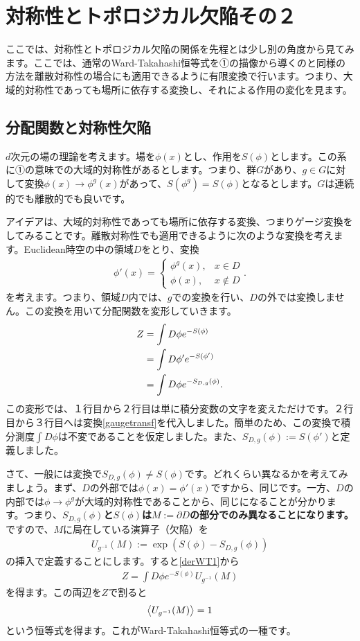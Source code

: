 \documentclass[report,paper=a4, fontsize=12pt, line_length=16cm, number_of_lines=33,dvipdfmx]{jlreq}
\newcommand{\kyou}[1]{{\sffamily \bfseries #1}}
\numberwithin{equation}{chapter}
\newcommand{\del}{\partial}
\begin{document}
\section{対称性とトポロジカル欠陥その２}
ここでは、対称性とトポロジカル欠陥の関係を先程とは少し別の角度から見てみます。ここでは、通常のWard-Takahashi恒等式を①の描像から導くのと同様の方法を離散対称性の場合にも適用できるように有限変換で行います。つまり、大域的対称性であっても場所に依存する変換し、それによる作用の変化を見ます。

\subsection{分配関数と対称性欠陥}
$d$次元の場の理論を考えます。場を$\phi(x)$とし、作用を$S(\phi)$とします。この系に①の意味での大域的対称性があるとします。つまり、群$G$があり、$g\in G$に対して変換$\phi(x) \to \phi^g(x)$があって、$S(\phi^g)=S(\phi)$となるとします。$G$は連続的でも離散的でも良いです。

アイデアは、大域的対称性であっても場所に依存する変換、つまりゲージ変換をしてみることです。離散対称性でも適用できるように次のような変換を考えます。Euclidean時空の中の領域$D$をとり、変換
\begin{align}
  \phi'(x)=
  \begin{cases}
    \phi^g(x), & x\in D\\
    \phi(x), & x \notin D
  \end{cases}
  .\label{gaugetransf}
\end{align}
を考えます。つまり、領域$D$内では、$g$での変換を行い、$D$の外では変換しません。この変換を用いて分配関数を変形していきます。
\begin{align}
  Z&=\int D\phi e^{-S(\phi)}\notag\\
   &= \int D\phi' e^{-S(\phi')}\notag\\ 
   &= \int D\phi e^{-S_{D,g}(\phi)}.\label{derWT1}
\end{align}
この変形では、１行目から２行目は単に積分変数の文字を変えただけです。２行目から３行目へは変換\eqref{gaugetransf}を代入しました。簡単のため、この変換で積分測度$\int D\phi$は不変であることを仮定しました。また、$S_{D,g}(\phi):=S(\phi')$と定義しました。

さて、一般には変換で$S_{D,g}(\phi)\ne S(\phi)$です。どれくらい異なるかを考えてみましょう。まず、$D$の外部では$\phi(x)=\phi'(x)$ですから、同じです。一方、$D$の内部では$\phi\to \phi^g$が大域的対称性であることから、同じになることが分かります。つまり、\kyou{$S_{D,g}(\phi)$と$S(\phi)$は$M:=\del D$の部分でのみ異なることになります。} ですので、$M$に局在している演算子（欠陥）を
\begin{align}
  U_{g^{-1}}(M):=\exp(S(\phi)-S_{D,g}(\phi))
\end{align}
の挿入で定義することにします。すると\eqref{derWT1}から
\begin{align}
  Z=\int D\phi e^{-S(\phi)}U_{g^{-1}}(M)
\end{align}
を得ます。この両辺を$Z$で割ると
\begin{align}
  \expval{U_{g^{-1}}(M)}=1
\end{align}
という恒等式を得ます。これがWard-Takahashi恒等式の一種です。
\end{document}
